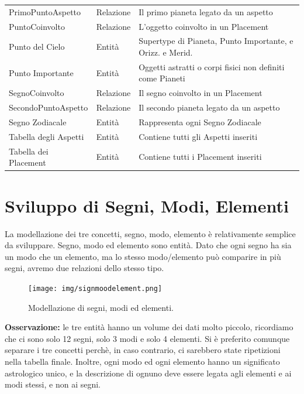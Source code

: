 {\begin{longtable}{ |p{4cm}|p{1.8cm}|p{5.7cm}|  }
PrimoPuntoAspetto & Relazione & Il primo pianeta legato da un aspetto \\
PuntoCoinvolto & Relazione & L'oggetto coinvolto in un Placement \\
Punto del Cielo & Entità & Supertype di Pianeta, Punto Importante, e Orizz. e Merid. \\
Punto Importante & Entità & Oggetti astratti o corpi fisici non definiti come Pianeti \\
SegnoCoinvolto & Relazione & Il segno coinvolto in un Placement \\
SecondoPuntoAspetto & Relazione & Il secondo pianeta legato da un aspetto \\
Segno Zodiacale & Entità & Rappresenta ogni Segno Zodiacale \\
Tabella degli Aspetti & Entità & Contiene tutti gli Aspetti inseriti\\
Tabella dei Placement & Entità & Contiene tutti i Placement inseriti \\
\hline
\end{longtable}
}
\newpage

\section{Sviluppo di Segni, Modi, Elementi}
La modellazione dei tre concetti, segno, modo, elemento è relativamente semplice da sviluppare.\newline
Segno, modo ed elemento sono entità. Dato che ogni segno ha sia un modo che un elemento, ma lo stesso modo/elemento può comparire in più segni, avremo due relazioni dello stesso tipo.
\begin{figure}[H]
\centering
\texttt{[image: img/signmoodelement.png]}
\caption{Modellazione di segni, modi ed elementi.}
\label{fig:signmoodelement}
\end{figure}
\textbf{Osservazione:} le tre entità hanno un volume dei dati molto piccolo, ricordiamo che ci sono solo 12 segni, solo 3 modi e solo 4 elementi. Si è preferito comunque separare i tre concetti perchè, in caso contrario, ci sarebbero state ripetizioni nella tabella finale. Inoltre, ogni modo ed ogni elemento hanno un significato astrologico unico, e la descrizione di ognuno deve essere legata agli elementi e ai modi stessi, e non ai segni.

\newpage

